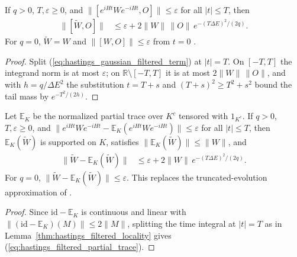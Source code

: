\begin{lemma}
    \label{thm:hastings_filtered_locality}
    \leanok
    If $q>0$, $T,\varepsilon\ge0$, and
    $\|[e^{iHt}We^{-iHt},O]\|\le\varepsilon$ for all $|t|\le T$, then
    \begin{align}
        \|[\widetilde W,O]\| & \le\varepsilon
        +2\|W\|\,\|O\|\,e^{-(T\Delta E)^2/(2q)}.
        \label{eq:hastings_filtered_locality}
    \end{align}
    For $q=0$, $\widetilde W=W$ and $\|[W,O]\|\le\varepsilon$ from $t=0$
    \cite[lines 816--828]{Hastings2007AreaLaw}.
\end{lemma}
\begin{proof}\leanok
    Split (\ref{eq:hastings_gaussian_filtered_term}) at $|t|=T$. On $[-T,T]$
    the integrand norm is at most $\varepsilon$; on $\mathbb R\setminus[-T,T]$
    it is at most $2\|W\|\,\|O\|$, and with $h=q/\Delta E^2$ the substitution
    $t=T+s$ and $(T+s)^2\ge T^2+s^2$ bound the tail mass by $e^{-T^2/(2h)}$.
\end{proof}

\begin{lemma}
    \label{thm:hastings_filtered_partial_trace}
    \leanok
    Let $\mathbb E_K$ be the normalized partial trace over $K^c$ tensored with
    $1_{K^c}$. If $q>0$, $T,\varepsilon\ge0$, and
    $\|e^{iHt}We^{-iHt}-\mathbb E_K(e^{iHt}We^{-iHt})\|\le\varepsilon$ for all
    $|t|\le T$, then $\mathbb E_K(\widetilde W)$ is supported on $K$, satisfies
    $\|\mathbb E_K(\widetilde W)\|\le\|W\|$, and
    \begin{align}
        \|\widetilde W-\mathbb E_K(\widetilde W)\| & \le\varepsilon
        +2\|W\|\,e^{-(T\Delta E)^2/(2q)}.
        \label{eq:hastings_filtered_partial_trace}
    \end{align}
    For $q=0$, $\|\widetilde W-\mathbb E_K(\widetilde W)\|\le\varepsilon$. This
    replaces the truncated-evolution approximation of
    \cite[lines 816--828]{Hastings2007AreaLaw}.
\end{lemma}
\begin{proof}\leanok
    Since $\mathrm{id}-\mathbb E_K$ is continuous and linear with
    $\|(\mathrm{id}-\mathbb E_K)(M)\|\le2\|M\|$, splitting the time integral at
    $|t|=T$ as in Lemma~\ref{thm:hastings_filtered_locality} gives
    (\ref{eq:hastings_filtered_partial_trace}).
\end{proof}

